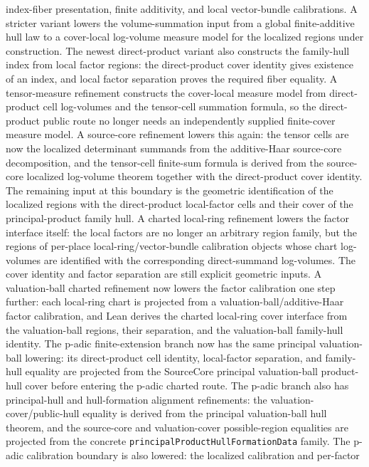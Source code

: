 \documentclass[11pt]{article}
\theoremstyle{plain}
\theoremstyle{definition}
\theoremstyle{remark}
\begin{document}
index-fiber presentation, finite additivity, and local vector-bundle
calibrations.  A stricter variant lowers the volume-summation input from a
global finite-additive hull law to a cover-local log-volume measure model for
the localized regions under construction.  The newest direct-product variant
also constructs the family-hull index from local factor regions: the
direct-product cover identity gives existence of an index, and local factor
separation proves the required fiber equality.  A tensor-measure refinement
constructs the cover-local measure model from direct-product cell log-volumes
and the tensor-cell summation formula, so the direct-product public route no
longer needs an independently supplied finite-cover measure model.
A source-core refinement lowers this again: the tensor cells are now the
localized determinant summands from the additive-Haar source-core
decomposition, and the tensor-cell finite-sum formula is derived from the
source-core localized log-volume theorem together with the direct-product
cover identity.  The remaining input at this boundary is the geometric
identification of the localized regions with the direct-product local-factor
cells and their cover of the principal-product family hull.
A charted local-ring refinement lowers the factor interface itself: the local
factors are no longer an arbitrary region family, but the regions of
per-place local-ring/vector-bundle calibration objects whose chart log-volumes
are identified with the corresponding direct-summand log-volumes.  The cover
identity and factor separation are still explicit geometric inputs.  A
valuation-ball charted refinement now lowers the factor calibration one step
further: each local-ring chart is projected from a valuation-ball/additive-Haar
factor calibration, and Lean derives the charted local-ring cover interface
from the valuation-ball regions, their separation, and the valuation-ball
family-hull identity.  The p-adic finite-extension branch now has the same
principal valuation-ball lowering: its direct-product cell identity,
local-factor separation, and family-hull equality are projected from the
SourceCore principal valuation-ball product-hull cover before entering the
p-adic charted route.  The p-adic branch also has principal-hull and
hull-formation alignment refinements: the valuation-cover/public-hull equality
is derived from the principal valuation-ball hull theorem, and the source-core
and valuation-cover possible-region equalities are projected from the concrete
\texttt{principalProductHullFormationData} family.  The p-adic calibration
boundary is also lowered: the localized calibration and per-factor
\end{document}
